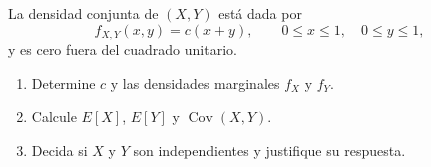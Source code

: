 La densidad conjunta de $(X,Y)$ está dada por
\[
f_{X,Y}(x,y)=c(x+y),\qquad 0\leq x\leq1,\quad 0\leq y\leq1,
\]
y es cero fuera del cuadrado unitario.
\begin{enumerate}
    \item Determine $c$ y las densidades marginales $f_X$ y $f_Y$.
    \item Calcule $E[X]$, $E[Y]$ y $\operatorname{Cov}(X,Y)$.
    \item Decida si $X$ y $Y$ son independientes y justifique su respuesta.
\end{enumerate}
